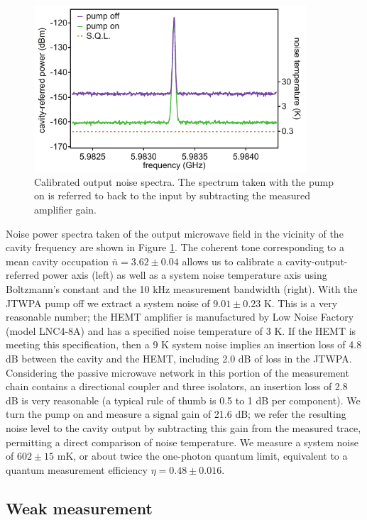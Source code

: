 \begin{figure}
\begin{center}
\includegraphics[width=4in]{twpa_exp/snr_trace}
\end{center}
\caption[Calibrated output noise spectra]{Calibrated output noise spectra.  The spectrum taken with the pump on is referred to back to the input by subtracting the measured amplifier gain.}
\label{fig:snr_trace}
\end{figure}

Noise power spectra taken of the output microwave field in the vicinity of the cavity frequency are shown in Figure \ref{fig:snr_trace}.  The coherent tone corresponding to a mean cavity occupation $\bar{n} = 3.62 \pm 0.04$ allows us to calibrate a cavity-output-referred power axis (left) as well as a system noise temperature axis using Boltzmann's constant and the 10 kHz measurement bandwidth (right).  With the JTWPA pump off we extract a system noise of $9.01 \pm 0.23$ K.  This is a very reasonable number; the HEMT amplifier is manufactured by Low Noise Factory (model LNC4-8A) and has a specified noise temperature of 3 K.  If the HEMT is meeting this specification, then a 9 K system noise implies an insertion loss of 4.8 dB between the cavity and the HEMT, including 2.0 dB of loss in the JTWPA.  Considering the passive microwave network in this portion of the measurement chain contains a directional coupler and three isolators, an insertion loss of 2.8 dB is very reasonable (a typical rule of thumb is 0.5 to 1 dB per component).  We turn the pump on and measure a signal gain of 21.6 dB; we refer the resulting noise level to the cavity output by subtracting this gain from the measured trace, permitting a direct comparison of noise temperature.  We measure a system noise of $602 \pm 15$ mK, or about twice the one-photon quantum limit, equivalent to a quantum measurement efficiency $\eta = 0.48 \pm 0.016$.

\subsection{Weak measurement}\label{s:weak_meas}

